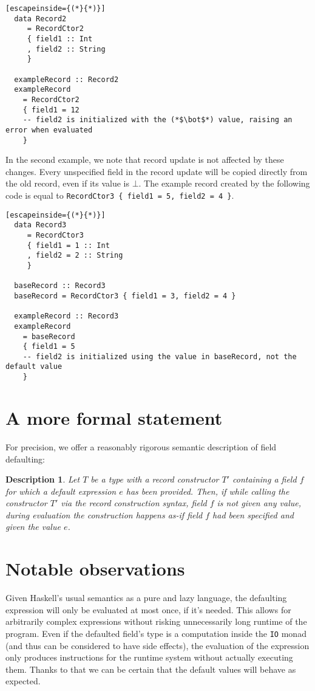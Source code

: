 \documentclass[en]{pracamgr}
\begin{document}
\begin{lstlisting}[escapeinside={(*}{*)}]
  data Record2
     = RecordCtor2 
     { field1 :: Int
     , field2 :: String
     }  

  exampleRecord :: Record2
  exampleRecord 
    = RecordCtor2 
    { field1 = 12
    -- field2 is initialized with the (*$\bot$*) value, raising an error when evaluated
    }

\end{lstlisting}

In the second example, we note that record update is not affected by these changes. 
Every unspecified field in the record update will be copied directly from the old record, even if its value is $\bot$.
The example record created by the following code is equal to \texttt{RecordCtor3 \{ field1 = 5, field2 = 4 \}}.

\begin{lstlisting}[escapeinside={(*}{*)}]
  data Record3
     = RecordCtor3
     { field1 = 1 :: Int
     , field2 = 2 :: String
     }  

  baseRecord :: Record3
  baseRecord = RecordCtor3 { field1 = 3, field2 = 4 }

  exampleRecord :: Record3
  exampleRecord 
    = baseRecord
    { field1 = 5
    -- field2 is initialized using the value in baseRecord, not the default value
    }

\end{lstlisting}

\section{A more formal statement}
For precision, we offer a reasonably rigorous semantic description of field defaulting:
\newtheorem{remark}{Description}
\begin{remark}
  \normalfont
  Let $T$ be a type with a record constructor $T'$ containing a field $f$ for which a default expression $e$ has been provided.
  Then, if while calling the constructor $T'$ via the record construction syntax, field $f$ is not given any value, during evaluation the construction happens \textit{as-if} field $f$ had been specified and given the value $e$.
\end{remark}

\section{Notable observations}
Given Haskell's usual semantics as a pure and lazy language, the defaulting expression will only be evaluated at most once, if it's needed.
This allows for arbitrarily complex expressions without risking unnecessarily long runtime of the program. 
Even if the defaulted field's type is a computation inside the \texttt{IO} monad (and thus can be considered to have side effects), the evaluation of the expression only produces instructions for the runtime system without actually executing them.
Thanks to that we can be certain that the default values will behave as expected.
\end{document}
